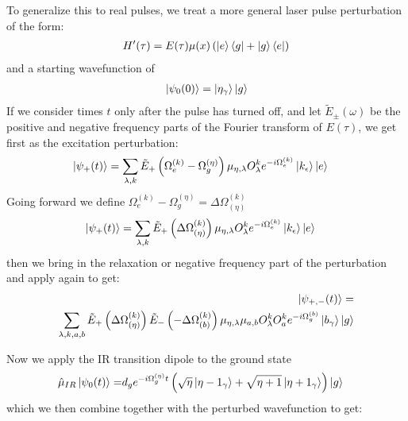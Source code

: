 To generalize this to real pulses, we treat a more general laser pulse perturbation of the form:
\begin{align}
	H'(\tau) = E(\tau) \mu(x) \left( \ket{e}\bra{g} + \ket{g}\bra{e}\right)
\end{align}
and a starting wavefunction of
\begin{align}
	\ket{\psi_0(0)} = \ket{\eta_{\gamma}} \ket{g}
\end{align}
If we consider times $t$ only after the pulse has turned off, and let $\tilde{E}_{\pm}(\omega)$ be the positive and negative frequency parts of the Fourier transform of $E(\tau)$, we get first as the excitation perturbation:
\begin{align*}
	\ket{\psi_+ (t) } &= \sum_{\lambda,k} \tilde{E}_{+}\left(\Omega_{e}^{(k)} - \Omega_{g}^{(\eta)}\right) \mu_{\eta,\lambda} O_{\lambda}^{k} e^{-i\Omega_{e}^{(k)}}\ket{k_{\epsilon}} \ket{e}
\end{align*}
Going forward we define $\Omega_{e}^{(k)} - \Omega_{g}^{(\eta)} = \Delta \Omega_{(\eta)}^{(k)}$
\begin{align*}
	\ket{\psi_+ (t) } &= \sum_{\lambda,k} \tilde{E}_{+}\left(\Delta \Omega_{(\eta)}^{(k)}\right) \mu_{\eta,\lambda} O_{\lambda}^{k} e^{-i\Omega_{e}^{(k)}}\ket{k_{\epsilon}} \ket{e}
\end{align*}
then we bring in the relaxation or negative frequency part of the perturbation and apply again to get:
\begin{align*}
	\ket{\psi_{+, -} (t) } =\\
	 \sum_{\lambda,k, a, b} \tilde{E}_{+} \left(\Delta \Omega_{(\eta)}^{(k)}\right)  \tilde{E}_{-}\left(-\Delta \Omega_{(b)}^{(k)}\right)  \mu_{\eta,\lambda}\mu_{a,b} O_{\lambda}^{k} O_{a}^{k} e^{-i\Omega_{g}^{(b)}} \ket{b_{\gamma}} \ket{g}
\end{align*}

Now we apply the IR transition dipole to the ground state
\begin{align*}
	\hat{\mu}_{IR}\ket{\psi_0 (t) } =&  d_ge^{-i \Omega_{g}^{(\eta )} t}  \left(\sqrt{\eta}\ket{\eta-1_{\gamma}}  + \sqrt{\eta + 1}\ket{\eta+1_{\gamma}}  \right)\ket{g}
\end{align*}
which we then combine together with the perturbed wavefunction to get:


